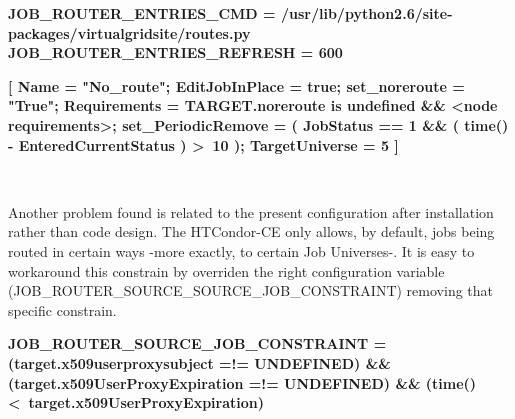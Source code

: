 \documentclass[a4paper]{jpconf}
\begin{document}
\begin{center}
    \colorbox{htcondorbox}{
        \begin{minipage}{\textwidth}
        \small
            \bf{JOB\_ROUTER\_ENTRIES\_CMD = \newline 
                \hspace*{1cm}/usr/lib/python2.6/site-packages/virtualgridsite/routes.py \newline
                JOB\_ROUTER\_ENTRIES\_REFRESH = 600
            }
        \end{minipage}
    }
\end{center}

\begin{center}
    \colorbox{htcondorbox}{
        \begin{minipage}{\textwidth}
        \small
            \bf{[
                 Name = "No\_route";  \newline
                 EditJobInPlace = true; \newline
                 set\_noreroute = "True"; \newline
                 Requirements = TARGET.noreroute is undefined \&\& \textless node requirements\textgreater;  \newline
                 set\_PeriodicRemove = ( JobStatus == 1 \&\& ( time() - EnteredCurrentStatus ) \textgreater \ 10 ); \newline
                 TargetUniverse = 5 \newline
                 ]
            }
        \end{minipage}
    }
\end{center}

~

Another problem found is related to the present configuration after installation rather than code design. 
The HTCondor-CE only allows, by default, jobs being routed in certain ways -more exactly, to certain Job Universes-.
It is easy to workaround this constrain by overriden the right configuration variable (JOB\_ROUTER\_SOURCE\_SOURCE\_JOB\_CONSTRAINT) removing that specific constrain. 

\begin{center}
    \colorbox{htcondorbox}{
        \begin{minipage}{\textwidth}
        \small
            \bf{JOB\_ROUTER\_SOURCE\_JOB\_CONSTRAINT = \newline
               (target.x509userproxysubject =!= UNDEFINED) \&\& \newline
               (target.x509UserProxyExpiration =!= UNDEFINED) \&\& \newline
               (time() \textless \  target.x509UserProxyExpiration)
            }
        \end{minipage}
    }
\end{center}
\end{document}
